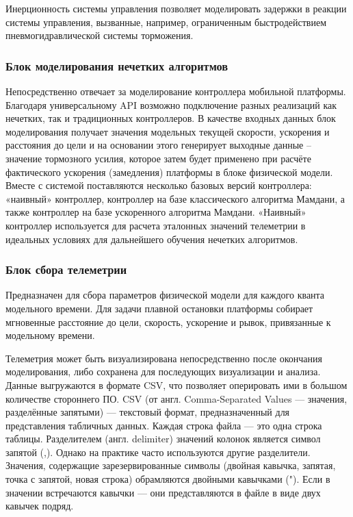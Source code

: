 Инерционность системы управления позволяет моделировать задержки в реакции системы управления, вызванные, например, ограниченным быстродействием пневмогидравлической системы торможения.

\subsubsection{Блок моделирования нечетких алгоритмов}

Непосредственно отвечает за моделирование контроллера мобильной платформы. Благодаря универсальному API возможно подключение разных реализаций как нечетких, так и традиционных контроллеров. В качестве входных данных блок моделирования получает значения модельных текущей скорости, ускорения и расстояния до цели и на основании этого генерирует выходные данные – значение тормозного усилия, которое затем будет применено при расчёте фактического ускорения (замедления) платформы в блоке физической модели. Вместе с системой поставляются несколько базовых версий контроллера: «наивный» контроллер, контроллер на базе классического алгоритма Мамдани, а также контроллер на базе ускоренного алгоритма Мамдани. «Наивный» контроллер используется для расчета эталонных значений телеметрии в идеальных условиях для дальнейшего обучения нечетких алгоритмов.

\subsubsection{Блок сбора телеметрии }

Предназначен для сбора параметров физической модели для каждого кванта модельного времени. Для задачи плавной остановки платформы собирает мгновенные расстояние до цели, скорость, ускорение и рывок, привязанные к модельному времени.

Телеметрия может быть визуализирована непосредственно после окончания моделирования, либо сохранена для последующих визуализации и анализа. Данные выгружаются в формате CSV, что позволяет оперировать ими в большом количестве стороннего ПО. CSV (от англ. Comma-Separated Values — значения, разделённые запятыми) — текстовый формат, предназначенный для представления табличных данных. Каждая строка файла — это одна строка таблицы. Разделителем (англ. delimiter) значений колонок является символ запятой (,). Однако на практике часто используются другие разделители. Значения, содержащие зарезервированные символы (двойная кавычка, запятая, точка с запятой, новая строка) обрамляются двойными кавычками ("). Если в значении встречаются кавычки — они представляются в файле в виде двух кавычек подряд.
